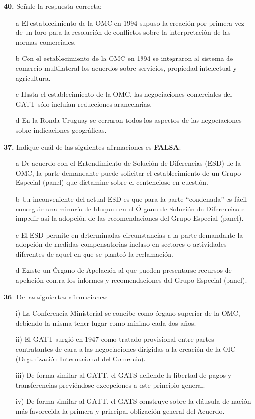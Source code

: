 \documentclass{nuevotema}
\begin{document}
\textbf{40.} Señale la respuesta correcta:
\begin{itemize}
	\item[a] El establecimiento de la OMC en 1994 supuso la creación por primera vez de un foro para la resolución de conflictos sobre la interpretación de las normas comerciales.
	\item[b] Con el establecimiento de la OMC en 1994 se integraron al sistema de comercio multilateral los acuerdos sobre servicios, propiedad intelectual y agricultura.
	\item[c] Hasta el establecimiento de la OMC, las negociaciones comerciales del GATT sólo incluían reducciones arancelarias.
	\item[d] En la Ronda Uruguay se cerraron todos los aspectos de las negociaciones sobre indicaciones geográficas.
\end{itemize}


\textbf{37.} Indique cuál de las siguientes afirmaciones es \textbf{FALSA}:
\begin{itemize}
	\item[a] De acuerdo con el Entendimiento de Solución de Diferencias (ESD) de la OMC, la parte demandante puede solicitar el establecimiento de un Grupo Especial (panel) que dictamine sobre el contencioso en cuestión.
	\item[b] Un inconveniente del actual ESD es que para la parte ``condenada'' es fácil conseguir una minoría de bloqueo en el Órgano de Solución de Diferencias e impedir así la adopción de las recomendaciones del Grupo Especial (panel).
	\item[c] El ESD permite en determinadas circunstancias a la parte demandante la adopción de medidas compensatorias incluso en sectores o actividades diferentes de aquel en que se planteó la reclamación.
	\item[d] Existe un Órgano de Apelación al que pueden presentarse recursos de apelación contra los informes y recomendaciones del Grupo Especial (panel).
\end{itemize}


\textbf{36.} De las siguientes afirmaciones:

\begin{itemize}
	\item[i)] La Conferencia Ministerial se concibe como órgano superior de la OMC, debiendo la misma tener lugar como mínimo cada dos años.
	\item[ii)] El GATT surgió en 1947 como tratado provisional entre partes contratantes de cara a las negociaciones dirigidas a la creación de la OIC (Organización Internacional del Comercio).
	\item[iii)] De forma similar al GATT, el GATS defiende la libertad de pagos y transferencias previéndose excepciones a este principio general.
	\item[iv)] De forma similar al GATT, el GATS construye sobre la cláusula de nación más favorecida la primera y principal obligación general del Acuerdo.
\end{itemize}
\end{document}
